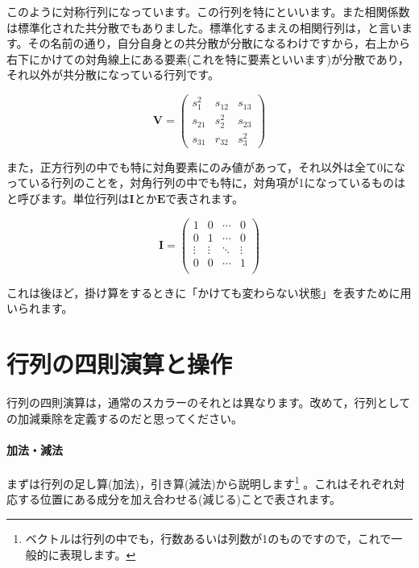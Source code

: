 \documentclass{ltjsbook}
\begin{document}
このように対称行列になっています。この行列を特にといいます。また相関係数は標準化された共分散でもありました。標準化するまえの相関行列は，と言います。その名前の通り，自分自身との共分散が分散になるわけですから，右上から右下にかけての対角線上にある要素(これを特に要素といいます)が分散であり，それ以外が共分散になっている行列です。

\begin{equation*}
    \bm{V} = 
    \begin{pmatrix}
        s_1^2 & s_{12} & s_{13} \\
        s_{21} & s_2^2 & s_{23} \\
        s_{31} & r_{32} & s_3^2
    \end{pmatrix}
\end{equation*}

また，正方行列の中でも特に対角要素にのみ値があって，それ以外は全て$0$になっている行列のことを，対角行列の中でも特に，対角項が1になっているものはと呼びます。単位行列は$\bm{I}$とか$\bm{E}$で表されます。


\begin{equation*}
    \bm{I} =
    \begin{pmatrix}
        1      & 0      & \cdots & 0 \\
        0      & 1      & \cdots & 0 \\
        \vdots & \vdots & \ddots & \vdots \\
        0      & 0      & \cdots & 1 \\
        \end{pmatrix}
\end{equation*}


これは後ほど，掛け算をするときに「かけても変わらない状態」を表すために用いられます。



\section{行列の四則演算と操作}
行列の四則演算は，通常のスカラーのそれとは異なります。改めて，行列としての加減乗除を定義するのだと思ってください。

\paragraph{加法・減法}
まずは行列の足し算(加法)，引き算(減法)から説明します\footnote{ベクトルは行列の中でも，行数あるいは列数が1のものですので，これで一般的に表現します。} 。これはそれぞれ対応する位置にある成分を加え合わせる(減じる)ことで表されます。
\end{document}
